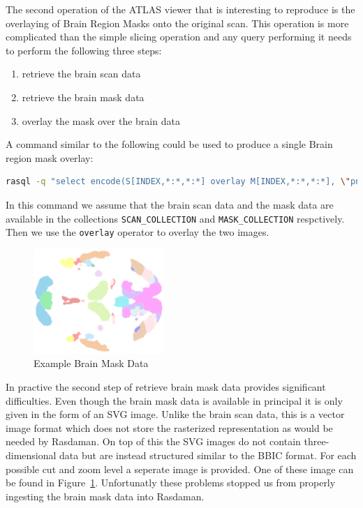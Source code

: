 The second operation of the ATLAS viewer that is interesting to reproduce is the overlaying of Brain Region Masks onto the original scan. This operation is more complicated than the simple slicing operation and any query performing it needs to perform the following three steps:
\begin{enumerate}
  \item retrieve the brain scan data
  \item retrieve the brain mask data
  \item overlay the mask over the brain data
\end{enumerate}

A command similar to the following could be used to produce a single Brain region mask overlay:
\begin{lstlisting}[showstringspaces=false,morekeywords={INDEX,MASK_COLLECTION,SCAN_COLLECTION,FILENAME},language=Bash]
rasql -q "select encode(S[INDEX,*:*,*:*] overlay M[INDEX,*:*,*:*], \"png\") from MASK_COLLECTION M, SCAN_COLLECTION S" --out file --filename FILENAME
\end{lstlisting}

In this command we assume that the brain scan data and the mask data are available in the collections \lstinline{SCAN_COLLECTION} and \lstinline{MASK_COLLECTION} respctively. Then we use the \lstinline{overlay} operator to overlay the two images.

\begin{figure}[h]
  \centering
  \includegraphics{imgs/Mask}
  \caption{Example Brain Mask Data}
  \label{fig:mask}
\end{figure}

In practive the second step of retrieve brain mask data provides significant difficulties. Even though the brain mask data is available in principal it is only given in the form of an SVG image. Unlike the brain scan data, this is a vector image format which does not store the rasterized representation as would be needed by Rasdaman. On top of this the SVG images do not contain three-dimensional data but are instead structured similar to the BBIC format. For each possible cut and zoom level a seperate image is provided. One of these image can be found in Figure~\ref{fig:mask}. Unfortunatly these problems stopped us from properly ingesting the brain mask data into Rasdaman.

